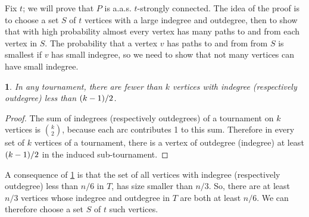 \documentclass[11pt,english]{article}
\theoremstyle{plain}
\theoremstyle{definition}
\theoremstyle{definition}
\theoremstyle{plain}
\theoremstyle{plain}
\theoremstyle{plain}
\newtheorem{lem}[thm]{\protect\lemmaname}
\theoremstyle{plain}
\theoremstyle{remark}
\theoremstyle{remark}
\let\originalleft\left
\let\originalright\right
\renewcommand{\left}{\mathopen{}\mathclose\bgroup\originalleft}
\renewcommand{\right}{\aftergroup\egroup\originalright}
\providecommand{\lemmaname}{Lemma}
\begin{document}
Fix $t$; we will prove that $P$ is a.a.s. $t$-strongly connected. The
idea of the proof is to choose a set $S$ of $t$ vertices with a
large indegree and outdegree, then to show that with high probability
almost every vertex has many paths to and from each vertex in $S$.
The probability that a vertex $v$ has paths to and from from $S$ is smallest
if $v$ has small indegree, so we need to show that not many vertices
can have small indegree.
\begin{lem}
\label{lem:extreme-indegree-bound}In any tournament, there are fewer
than $k$ vertices with indegree (respectively outdegree) less than
$\left(k-1\right)/2$.\end{lem}
\begin{proof}
The sum of indegrees (respectively outdegrees) of a tournament on
$k$ vertices is ${k \choose 2}$, because each arc contributes 1
to this sum. Therefore in every set of $k$ vertices of a tournament,
there is a vertex of outdegree (indegree) at least $\left(k-1\right)/2$
in the induced sub-tournament.
\end{proof}
A consequence of \ref{lem:extreme-indegree-bound} is that the set
of all vertices with indegree (respectively outdegree) less than $n/6$
in $T$, has size smaller than $n/3$. So, there are at least $n/3$ vertices
whose indegree and outdegree in $T$ are both at least $n/6$. We can therefore choose
a set $S$ of $t$ such vertices.
\end{document}
